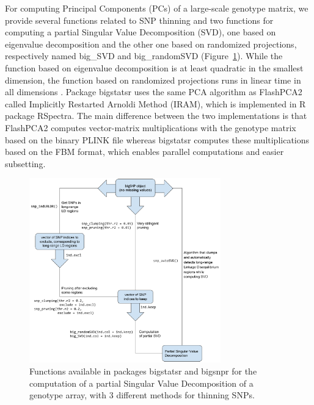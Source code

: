\documentclass{bioinfo}
\begin{document}
\begin{methods}
For computing Principal Components (PCs) of a large-scale genotype matrix, we provide several functions related to SNP thinning and two functions for computing a partial Singular Value Decomposition (SVD), one based on eigenvalue decomposition and the other one based on randomized projections, respectively named big\_SVD and big\_randomSVD (Figure~\ref{fig:svd}). While the function based on eigenvalue decomposition is at least quadratic in the smallest dimension, the function based on randomized projections runs in linear time in all dimensions \cite[]{Lehoucq1996}. Package bigstatsr uses the same PCA algorithm as FlashPCA2 called Implicitly Restarted Arnoldi Method (IRAM), which is implemented in R package RSpectra. The main difference between the two implementations is that FlashPCA2 computes vector-matrix multiplications with the genotype matrix based on the binary PLINK file whereas bigstatsr computes these multiplications based on the FBM format, which enables parallel computations and easier subsetting. 

\begin{figure}[!tpb]
\centerline{\includegraphics[width=235pt]{svd.pdf}}
\caption{Functions available in packages bigstatsr and bigsnpr for the computation of a partial Singular Value Decomposition of a genotype array, with 3 different methods for thinning SNPs.}\label{fig:svd}
\end{figure}
 

\end{methods}
\end{document}
